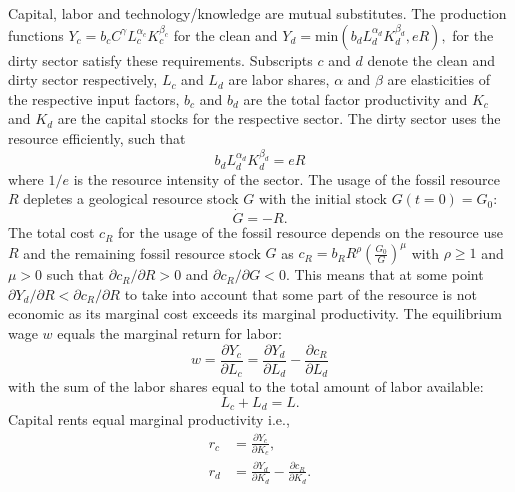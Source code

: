 Capital, labor and technology/knowledge are mutual substitutes. The production functions $Y_c = b_c C^{\gamma} L_c^{\alpha_c}K_c^{\beta_c}$  for the clean and 	$Y_d = \mathrm{ min}\left( b_d L_d^{\alpha_d}K_d^{\beta_d}, e R \right),$ for the dirty sector satisfy these requirements. Subscripts $c$ and $d$ denote the clean and dirty sector respectively, $L_c$ and $L_d$ are labor shares, $\alpha$ and $\beta$ are elasticities of the respective input factors, $b_c$ and $b_d$ are the total factor productivity and $K_c$ and $K_d$ are the capital stocks for the respective sector.
The dirty sector uses the resource efficiently, such that
\begin{equation}
    b_d L_d^{\alpha_d}K_d^{\beta_d} = e R
    \label{eq:approx_edr}
\end{equation}
where $1/e$ is the resource intensity of the sector. The usage of the fossil resource $R$ depletes a geological resource stock $G$ with the initial stock $G(t=0) = G_0$:
\begin{equation}
    \dot{G} = -R. 
    \label{eq:approx_rdep}
\end{equation} 
The total cost $c_R$ for the usage of the fossil resource depends on the resource use $R$ and the remaining fossil resource stock $G$ as $c_R = b_R R^{\rho}\left( \frac{G_0}{G} \right)^{\mu}$ with $\rho \geq 1$ and $\mu > 0$ such that $\partial c_R / \partial R >0$ and $\partial c_R / \partial G < 0$.
This means that at some point $\partial Y_d / \partial R < \partial c_R / \partial R$ to take into account that some part of the resource is not economic as its marginal cost exceeds its marginal productivity.
The equilibrium wage $w$ equals the marginal return for labor:
\begin{equation}
	w = \frac{\partial Y_c}{\partial L_c} = \frac{\partial Y_d}{\partial L_d} - \frac{\partial c_R}{\partial L_d}
	\label{eq:approx_equilibrium_wage}
\end{equation}
with the sum of the labor shares equal to the total amount of labor available:
\begin{equation}
	L_c + L_d = L.
	\label{eq:approx_L}
\end{equation}
Capital rents equal marginal productivity i.e., 
\begin{align}
  r_c &= \frac{\partial Y_c}{\partial K_c}, \label{eq:approx_ccr}\\
  r_d &= \frac{\partial Y_d}{\partial K_d} - \frac{\partial c_R}{\partial K_d}. \label{eq:approx_dcr}
\end{align}

